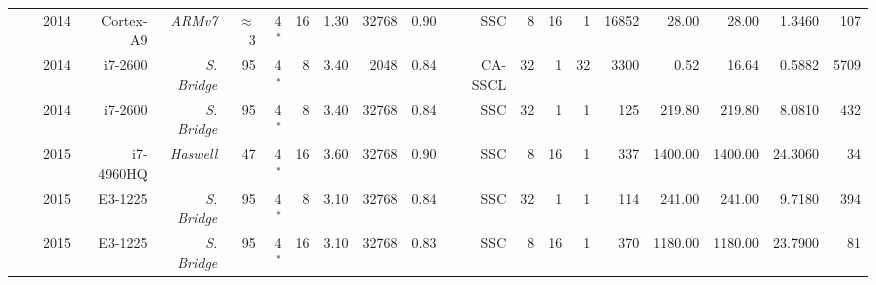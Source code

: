 \begin{table}
\begin{adjustbox}{angle=90}
{{\begin{tabular}{|r|r r|r r r r r r|r r|r r r r|r r|r r r|}
                                                                 & \cite{LeGal2014}     & 2014          & Cortex-A9          & \textit{ARMv7}     &  $\approx$3  &  4$^*$         &  16           & 1.30           & 32768    & 0.90     &      SSC           &  8            &   16             &  1                &   16852           &   28.00          &   28.00       &  1.3460        &    107             \\
                                                                 & \cite{Sarkis2014b}   & 2014          & i7-2600            & \textit{S. Bridge} &          95  &  4$^*$         &   8           & 3.40           &  2048    & 0.84     &   CA-SSCL          & 32            &    1             & 32                &    3300           &    0.52          &   16.64       &  0.5882        &   5709             \\
                                                                 & \cite{Sarkis2014}    & 2014          & i7-2600            & \textit{S. Bridge} &          95  &  4$^*$         &   8           & 3.40           & 32768    & 0.84     &      SSC           & 32            &    1             &  1                &     125           &  219.80          &  219.80       &  8.0810        &    432             \\
                                                                 & \cite{LeGal2015a}    & 2015          & i7-4960HQ          & \textit{Haswell}   &          47  &  4$^*$         &  16           & 3.60           & 32768    & 0.90     &      SSC           &  8            &   16             &  1                &     337           & 1400.00          & 1400.00       & 24.3060        &     34             \\
                                                                 & \cite{Cassagne2015c} & 2015          & E3-1225            & \textit{S. Bridge} &          95  &  4$^*$         &   8           & 3.10           & 32768    & 0.84     &      SSC           & 32            &    1             &  1                &     114           &  241.00          &  241.00       &  9.7180        &    394             \\
                                                                 & \cite{Cassagne2015c} & 2015          & E3-1225            & \textit{S. Bridge} &          95  &  4$^*$         &  16           & 3.10           & 32768    & 0.83     &      SSC           &  8            &   16             &  1                &     370           & 1180.00          & 1180.00       & 23.7900        &     81             \\

\end{tabular}}}
\end{adjustbox}
\end{table}
